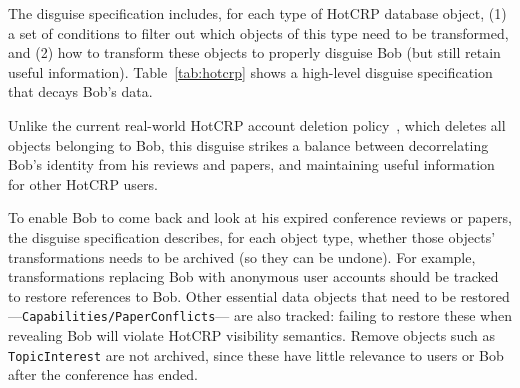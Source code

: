 The disguise specification includes, for each type of HotCRP database object, (1) a set of
conditions to filter out which objects of this type need to be transformed, and (2) how to transform
these objects to properly disguise Bob (but still retain useful information).
Table~\ref{tab:hotcrp} shows a high-level disguise specification that decays Bob's data.

Unlike the current real-world HotCRP account deletion policy~\cite{hotcrp:privacy}, which
deletes all objects belonging to Bob, this disguise strikes a balance between decorrelating
Bob's identity from his reviews and papers, and maintaining useful information for other
HotCRP users.

To enable Bob to come back and look at his expired conference reviews or papers, the disguise
specification describes, for each object type, whether those objects' transformations needs to be
archived (so they can be undone). For example, transformations replacing Bob with anonymous user
accounts should be tracked to restore references to Bob. Other essential data objects that need to
be restored---\texttt{Capabilities/PaperConflicts}--- are also tracked: failing to restore these
when revealing Bob will violate HotCRP visibility semantics. Remove objects such as  
\texttt{TopicInterest} are not archived, since these have little relevance to users or Bob
after the conference has ended.

